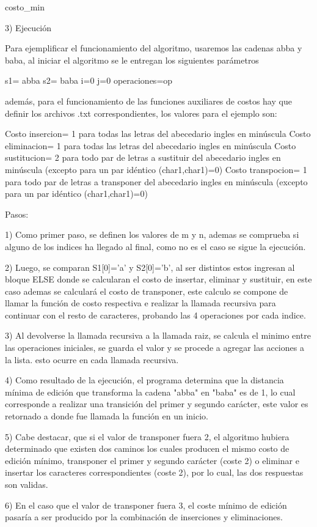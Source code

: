 \begin{algorithm}[H]
{        \Return costo\_min\;
    }


\end{algorithm}

3) Ejecución

Para ejemplificar el funcionamiento del algoritmo, usaremos las cadenas
abba y baba, al iniciar el algoritmo se le entregan los siguientes parámetros

s1= abba
s2= baba
i=0
j=0
operaciones=op

además, para el funcionamiento de las funciones auxiliares de costos
hay que definir los archivos .txt correspondientes, los valores para el ejemplo son:


Costo insercion= 1 para todas las letras del abecedario ingles en minúscula
Costo eliminacion= 1 para todas las letras del abecedario ingles en minúscula
Costo sustitucion= 2 para todo par de letras a sustituir del abecedario ingles en minúscula (excepto para un par idéntico (char1,char1)=0)
Costo transpocion= 1 para todo par de letras a transponer del abecedario ingles en minúscula (excepto para un par idéntico (char1,char1)=0)

Pasos:

1) Como primer paso, se definen los valores de m y n, ademas se comprueba si alguno de los 
indices ha llegado al final, como no es el caso se sigue la ejecución.

2) Luego, se comparan S1[0]='a' y S2[0]='b', al ser distintos estos ingresan al bloque ELSE 
donde se calcularan el costo de insertar, eliminar y sustituir, en este caso ademas
se calculará el costo de transponer, este calculo se compone de llamar la función de costo 
respectiva e realizar la llamada recursiva para continuar con el resto de caracteres, 
probando las 4 operaciones por cada indice.

3) Al devolverse la llamada recursiva a la llamada raiz, se calcula el minimo
entre las operaciones iniciales, se guarda el valor y se procede a agregar las
acciones a la lista. esto ocurre en cada llamada recursiva.

4) Como resultado de la ejecución, el programa determina que la distancia mínima de edición
que transforma la cadena "abba" en "baba" es de 1, lo cual corresponde a realizar una
transición del primer y segundo carácter, este valor es retornado a donde fue llamada
la función en un inicio.

5) Cabe destacar, que si el valor de transponer fuera 2, el 
algoritmo hubiera determinado que existen dos caminos los cuales producen
el mismo costo de edición mínimo, transponer el primer y segundo carácter (coste 2) o
eliminar e insertar los caracteres correspondientes (coste 2), por lo cual, las dos 
respuestas son validas.

6) En el caso que el valor de transponer fuera 3, el coste mínimo de edición
pasaría a ser producido por la combinación de inserciones y eliminaciones.



